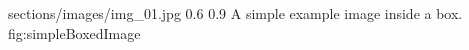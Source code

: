 \begin{centerBoxImageStyle}
    {sections/images/img_01.jpg}     
    {0.6\linewidth}                         
    {0.9\linewidth}                         
    {A simple example image inside a box.}  
    {fig:simpleBoxedImage}               
\end{centerBoxImageStyle}